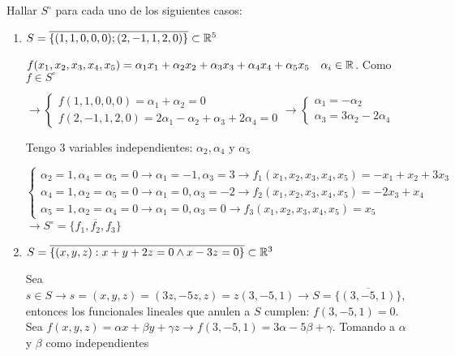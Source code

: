 \item Hallar $S^\circ$ para cada uno de los siguientes casos:
    \begin{enumerate}
        \item $S=\overline{\{(1,1,0,0,0);(2,-1,1,2,0)\}}\subset \mathbb{R}^5$
            \begin{mdframed}[style=s]
                $f(x_1,x_2,x_3,x_4,x_5)=\alpha_1x_1+\alpha_2x_2+\alpha_3x_3+\alpha_4x_4+\alpha_5x_5\quad \alpha_i\in\mathbb{R}$. Como $f\in S^\circ$
                \begin{center}
                    $\to\begin{cases}
                        f(1,1,0,0,0)=\alpha_1+\alpha_2=0\\
                        f(2,-1,1,2,0)=2\alpha_1-\alpha_2+\alpha_3+2\alpha_4=0
                    \end{cases}\to\begin{cases}
                        \alpha_1=-\alpha_2\\
                        \alpha_3=3\alpha_2-2\alpha_4
                    \end{cases}$
                \end{center}
                Tengo 3 variables independientes: $\alpha_2,\alpha_4$ y $\alpha_5$\\\pagebreak
                \begin{center}
                    $\begin{cases}
                        \alpha_2=1,\alpha_4=\alpha_5=0\to\alpha_1=-1,\alpha_3=3\to f_1(x_1,x_2,x_3,x_4,x_5)=-x_1+x_2+3x_3\\
                        \alpha_4=1,\alpha_2=\alpha_5=0\to\alpha_1=0,\alpha_3=-2\to f_2(x_1,x_2,x_3,x_4,x_5)=-2x_3+x_4\\
                        \alpha_5=1,\alpha_2=\alpha_4=0\to\alpha_1=0,\alpha_3=0\to f_3(x_1,x_2,x_3,x_4,x_5)=x_5
                    \end{cases}$
                    $\to S^\circ=\overline{\{f_1,f_2,f_3\}}$
                \end{center}
            \end{mdframed}
        \item $S=\overline{\{(x,y,z):x+y+2z=0\land x-3z=0\}}\subset \mathbb{R}^3$
            \begin{mdframed}[style=s]
                Sea $s\in S\to s=(x,y,z)=(3z,-5z,z)=z(3,-5,1)\to S=\overline{\{(3,-5,1)\}}$, entonces los funcionales lineales que anulen a $S$ cumplen: $f(3,-5,1)=0$. Sea $f(x,y,z)=\alpha x+\beta y+\gamma z\to f(3,-5,1)=3\alpha-5\beta+\gamma$. Tomando a $\alpha$ y $\beta$ como independientes

\end{mdframed}
\end{enumerate}
